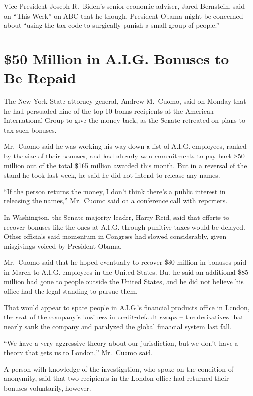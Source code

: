 \documentclass[12pt,a4paper,onecolumn]{article}
\begin{document}
\begin{CJK*}{GBK}{song}
Vice President Joseph R.~Biden's senior economic adviser, Jared Bernstein, said on ``This Week'' on
ABC that he thought President Obama might be concerned about ``using the tax code to surgically
punish a small group of people.''

\section{\$50 Million in A.I.G. Bonuses to Be Repaid}

The New York State attorney general, Andrew M.~Cuomo, said on Monday that he had persuaded nine of
the top 10 bonus recipients at the American International Group to give the money back, as the
Senate retreated on plans to tax such bonuses.

Mr.~Cuomo said he was working his way down a list of A.I.G. employees, ranked by the size of their
bonuses, and had already won commitments to pay back \$50 million out of the total \$165 million
awarded this month. But in a reversal of the stand he took last week, he said he did not intend to
release any names.

``If the person returns the money, I don't think there's a public interest in releasing the names,''
Mr.~Cuomo said on a conference call with reporters.

In Washington, the Senate majority leader, Harry Reid, said that efforts to recover bonuses like the
ones at A.I.G. through punitive taxes would be delayed. Other officials said momentum in Congress
had slowed considerably, given misgivings voiced by President Obama.

Mr.~Cuomo said that he hoped eventually to recover \$80 million in bonuses paid in March to A.I.G.
employees in the United States. But he said an additional \$85 million had gone to people outside
the United States, and he did not believe his office had the legal standing to pursue them.

That would appear to spare people in A.I.G.'s financial products office in London, the seat of the
company's business in credit-default swaps -- the derivatives that nearly sank the company and
paralyzed the global financial system last fall.

``We have a very aggressive theory about our jurisdiction, but we don't have a theory that gets us
to London,'' Mr.~Cuomo said.

A person with knowledge of the investigation, who spoke on the condition of anonymity, said that two
recipients in the London office had returned their bonuses voluntarily, however.


\end{CJK*}
\end{document}
